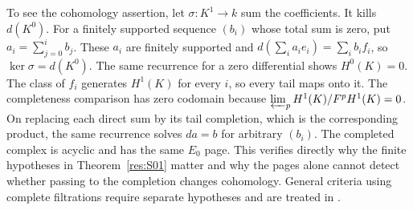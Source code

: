 To see the cohomology assertion, let $\sigma\colon K^1\to k$
sum the coefficients. It kills $d(K^0)$. For a finitely supported
sequence $(b_i)$ whose total sum is zero, put
$a_i=\sum_{j=0}^i b_j$. These $a_i$ are finitely supported and
$d(\sum_i a_i e_i)=\sum_i b_i f_i$, so $\ker\sigma=d(K^0)$.
The same recurrence for a zero differential shows $H^0(K)=0$.
The class of $f_i$ generates $H^1(K)$ for every $i$, so every
tail maps onto it. The completeness comparison has zero codomain
because $\varprojlim_p H^1(K)/F^pH^1(K)=0$. On replacing each direct sum
by its tail completion, which is the corresponding product, the
same recurrence solves $d a=b$ for arbitrary $(b_i)$.
The completed complex is acyclic and has the same $E_0$ page.
This verifies directly why the finite hypotheses in
Theorem~\ref{res:S01} matter and why the pages alone cannot detect
whether passing to the completion changes cohomology. General
criteria using complete filtrations require separate hypotheses
and are treated in \cite[Section 5.5]{weibel}.
